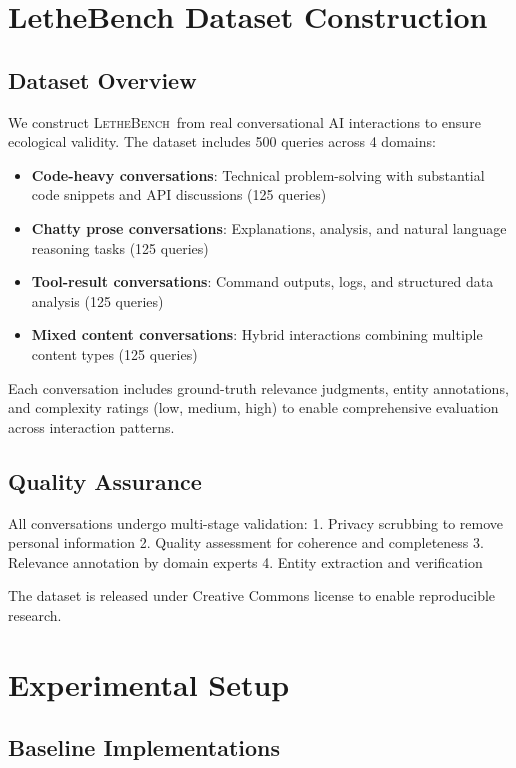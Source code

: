 \documentclass[letterpaper]{article}
\newcommand{\lethebench}{\textsc{LetheBench}}
\begin{document}
\section{LetheBench Dataset Construction}

\subsection{Dataset Overview}

We construct \lethebench\ from real conversational AI interactions to ensure ecological validity. The dataset includes 500 queries across 4 domains:

\begin{itemize}
    \item \textbf{Code-heavy conversations}: Technical problem-solving with substantial code snippets and API discussions (125 queries)
    \item \textbf{Chatty prose conversations}: Explanations, analysis, and natural language reasoning tasks (125 queries)
    \item \textbf{Tool-result conversations}: Command outputs, logs, and structured data analysis (125 queries)
    \item \textbf{Mixed content conversations}: Hybrid interactions combining multiple content types (125 queries)
\end{itemize}

Each conversation includes ground-truth relevance judgments, entity annotations, and complexity ratings (low, medium, high) to enable comprehensive evaluation across interaction patterns.

\subsection{Quality Assurance}

All conversations undergo multi-stage validation:
1. Privacy scrubbing to remove personal information
2. Quality assessment for coherence and completeness  
3. Relevance annotation by domain experts
4. Entity extraction and verification

The dataset is released under Creative Commons license to enable reproducible research.

\section{Experimental Setup}

\subsection{Baseline Implementations}
\end{document}
